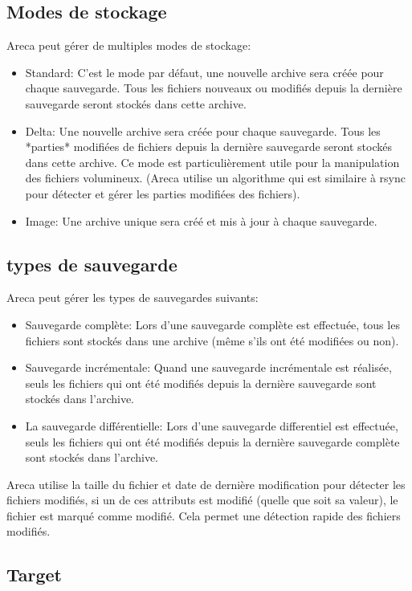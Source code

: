 \documentclass[a4paper,11pt]{report}
\begin{document}
\subsection {Modes de stockage}
Areca peut gérer de multiples modes de stockage:
\begin{itemize}
  \item Standard: C'est le mode par défaut, une nouvelle archive sera créée pour chaque sauvegarde. Tous les fichiers nouveaux ou modifiés depuis la dernière sauvegarde seront stockés dans cette archive.
  \item Delta: Une nouvelle archive sera créée pour chaque sauvegarde. Tous les *parties* modifiées de fichiers depuis la dernière sauvegarde seront stockés dans cette archive. Ce mode est particulièrement utile pour la manipulation des fichiers volumineux. (Areca utilise un algorithme qui est similaire à rsync pour détecter et gérer les parties modifiées des fichiers).
  \item Image: Une archive unique sera créé et mis à jour à chaque sauvegarde.
\end{itemize}

\subsection {types de sauvegarde}
Areca peut gérer les types de sauvegardes suivants:
\begin{itemize}
  \item Sauvegarde complète: Lors d'une sauvegarde complète est effectuée, tous les fichiers sont stockés dans une archive (même s'ils ont été modifiées ou non).
  \item Sauvegarde incrémentale: Quand une sauvegarde incrémentale est réalisée, seuls les fichiers qui ont été modifiés depuis la dernière sauvegarde sont stockés dans l'archive.
  \item La sauvegarde différentielle: Lors d'une sauvegarde differentiel est effectuée, seuls les fichiers qui ont été modifiés depuis la dernière sauvegarde complète sont stockés dans l'archive.
\end{itemize}

Areca utilise la taille du fichier et date de dernière modification pour détecter les fichiers modifiés, si un de ces attributs est modifié (quelle que soit sa valeur), le fichier est marqué comme modifié. Cela permet une détection rapide des fichiers modifiés.

\subsection {Target}
\end{document}
